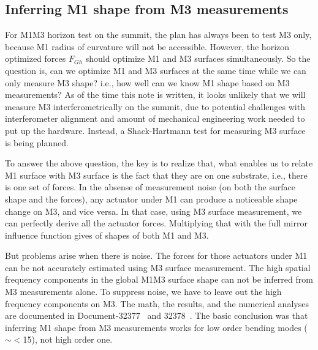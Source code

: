 \documentclass [twoside,openbib,12pt]{article}
\begin{document}
  \subsection{Inferring M1 shape from M3 measurements}
  
For M1M3 horizon test on the summit, the plan has always been to test
M3 only, because M1 radius of curvature will not be accessible.
However, the horizon optimized forces $F_{Gh}$ should optimize M1 and
M3 surfaces simultaneously. So the question is, can we optimize M1 and
M3 surfaces at the same time while we can only measure M3 shape? i.e., how
well can we know M1 shape based on M3 measurements?
As of the time this note is written, it looks unlikely that we will
measure M3 interferometrically on the summit, due to potential
challenges with interferometer alignment and amount of mechanical
engineering work needed to put up the hardware. Instead, a
Shack-Hartmann test for measuring M3 surface is being planned.

To answer the above question, the key is to realize that, what enables
us to relate M1 surface with M3 surface is the fact that they are on
one substrate, i.e., there is one set of forces.
In the absense of measurement noise (on both the surface shape and the
forces), any actuator under M1 can produce a noticeable shape change
on M3, and vice versa. In that case, using M3 surface measurement, we
can perfectly derive all the actuator forces. Multiplying that with the
full mirror influence function gives of shapes of both M1 and M3.

But problems arise when there is noise.
The forces for those actuators under M1 can be not accurately
estimated using M3 surface measurement.
The high spatial frequency
components in the global M1M3 surface shape can not be inferred from
M3 measurements alone.
To suppress noise, we have to leave out the high frequency components
on M3.
The math, the results, and the numerical analyses are documented in
Document-32377~\cite{inferm1p1} and 32378~\cite{inferm1p2}.
The basic conclusion was that
inferring M1 shape from M3 measurements works for low order bending modes ($\sim<$15), not high order one.
\end{document}
